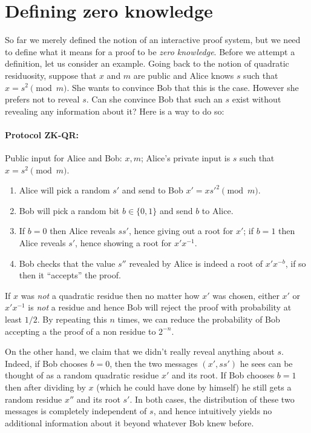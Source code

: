 \section{Defining zero knowledge}\label{Defining-zero-knowledge}

So far we merely defined the notion of an interactive proof system, but
we need to define what it means for a proof to be \emph{zero knowledge}.
Before we attempt a definition, let us consider an example. Going back
to the notion of quadratic residuosity, suppose that \(x\) and \(m\) are
public and Alice knows \(s\) such that \(x=s^2 \pmod{m}\). She wants to
convince Bob that this is the case. However she prefers not to reveal
\(s\). Can she convince Bob that such an \(s\) exist without revealing
any information about it? Here is a way to do so:

\paragraph{Protocol ZK-QR:} Public input for Alice and Bob: \(x,m\);
Alice's private input is \(s\) such that \(x=s^2 \pmod{m}\).

\begin{enumerate}
\def\labelenumi{\arabic{enumi}.}
\item
  Alice will pick a random \(s'\) and send to Bob
  \(x' = xs'^2 \pmod{m}\).
\item
  Bob will pick a random bit \(b\in\{0,1\}\) and send \(b\) to Alice.
\item
  If \(b=0\) then Alice reveals \(ss'\), hence giving out a root for
  \(x'\); if \(b=1\) then Alice reveals \(s'\), hence showing a root for
  \(x'x^{-1}\).
\item
  Bob checks that the value \(s''\) revealed by Alice is indeed a root
  of \(x'x^{-b}\), if so then it ``accepts'' the proof.
\end{enumerate}

If \(x\) was \emph{not} a quadratic residue then no matter how \(x'\)
was chosen, either \(x'\) or \(x'x^{-1}\) is \emph{not} a residue and
hence Bob will reject the proof with probability at least \(1/2\). By
repeating this \(n\) times, we can reduce the probability of Bob
accepting a the proof of a non residue to \(2^{-n}\).

On the other hand, we claim that we didn't really reveal anything about
\(s\). Indeed, if Bob chooses \(b=0\), then the two messages
\((x',ss')\) he sees can be thought of as a random quadratic residue
\(x'\) and its root. If Bob chooses \(b=1\) then after dividing by \(x\)
(which he could have done by himself) he still gets a random residue
\(x''\) and its root \(s'\). In both cases, the distribution of these
two messages is completely independent of \(s\), and hence intuitively
yields no additional information about it beyond whatever Bob knew
before.


